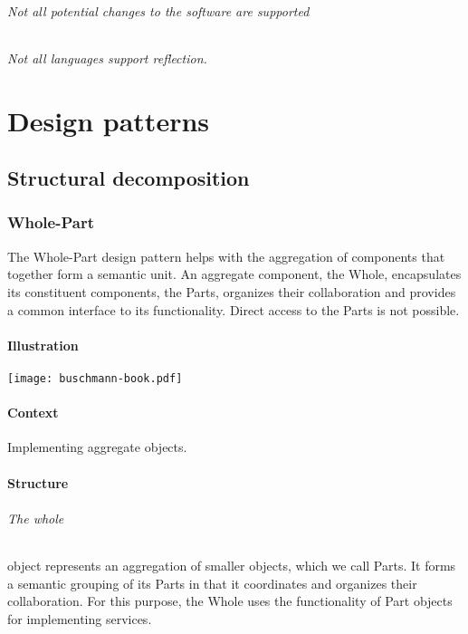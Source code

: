 \documentclass[a4paper,11pt,twocolumn]{report}
\begin{document}
    \paragraph{Not all potential changes to the software are supported}
    \paragraph{Not all languages support reflection.}



    \part{Design patterns}
    \chapter{Structural decomposition}

    \section{Whole-Part}
    The Whole-Part design pattern helps with the aggregation of components that
    together form a semantic unit. An aggregate component, the Whole,
    encapsulates its constituent components, the Parts, organizes their
    collaboration and provides a common interface to its functionality. Direct
    access to the Parts is not possible.
    \subsection{Illustration}
    \texttt{[image: buschmann-book.pdf]}
    \subsection{Context}
    Implementing aggregate objects.
    \subsection{Structure}
    \paragraph{The whole} object represents an aggregation of smaller objects,
    which we call Parts. It forms a semantic grouping of its Parts in that it
    coordinates and organizes their collaboration. For this purpose, the Whole
    uses the functionality of Part objects for implementing services.
\end{document}
